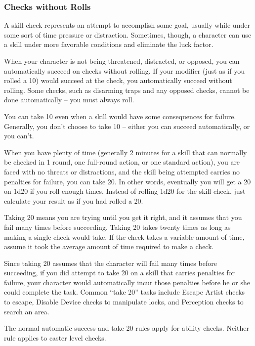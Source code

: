 \subsubsection{Checks without Rolls}
A skill check represents an attempt to accomplish some goal, usually while under some sort of time pressure or distraction. Sometimes, though, a character can use a skill under more favorable conditions and eliminate the luck factor.

\label{Taking 10} When your character is not being threatened, distracted, or opposed, you can automatically succeed on checks without rolling. If your modifier  (just as if you rolled a 10) would succeed at the check, you automatically succeed without rolling. Some checks, such as disarming traps and any opposed checks, cannot be done automatically -- you must always roll.

You can take 10 even when a skill would have some consequences for failure. Generally, you don't choose to take 10 -- either you can succeed automatically, or you can't.

 When you have plenty of time (generally 2 minutes for a skill that can normally be checked in 1 round, one full-round action, or one standard action), you are faced with no threats or distractions, and the skill being attempted carries no penalties for failure, you can take 20. In other words, eventually you will get a 20 on 1d20 if you roll enough times. Instead of rolling 1d20 for the skill check, just calculate your result as if you had rolled a 20.

Taking 20 means you are trying until you get it right, and it assumes that you fail many times before succeeding. Taking 20 takes twenty times as long as making a single check would take. If the check takes a variable amount of time, assume it took the average amount of time required to make a check.

Since taking 20 assumes that the character will fail many times before succeeding, if you did attempt to take 20 on a skill that carries penalties for failure, your character would automatically incur those penalties before he or she could complete the task. Common ``take 20'' tasks include Escape Artist checks to escape, Disable Device checks to manipulate locks, and Perception checks to search an area.

 The normal automatic success and take 20 rules apply for ability checks. Neither rule applies to caster level checks.

